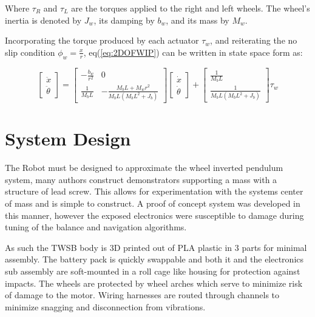     Where $\tau_R$ and $\tau_L$ are the torques applied to the right and left wheels. 
    The wheel's inertia is denoted by $J_w$, its damping by $b_w$, and its mass by $M_w$. 

    Incorporating the torque produced by each actuator $\tau_w$, 
    and reiterating the no slip condition $\phi_w = \frac{x}{r}$,
    eq(\ref{eq:2DOFWIP}) can be written in state space form as:

    \begin{equation}
        \begin{bmatrix}
            \ddot{x} \\
            \ddot{\theta}
        \end{bmatrix}
        =
        \begin{bmatrix}
            -\frac{b_w}{r^2} & 0 \\
            \frac{1}{M_b L} & -\frac{M_b L + M_w r^2}{M_b L (M_b L^2 + J_b)}
        \end{bmatrix}
        \begin{bmatrix}
            \dot{x} \\
            \dot{\theta}
        \end{bmatrix}
        +
        \begin{bmatrix}
            \frac{1}{M_b L} \\
            \frac{1}{M_b L (M_b L^2 + J_b)}
        \end{bmatrix}
        \tau_w
        \label{eq:2DOF}
    \end{equation}


   

    
    \pagebreak{}


    \section{System Design}
        The Robot must be designed to approximate the wheel inverted pendulum system, many authors 
        construct demonstrators supporting a mass with a structure of lead screw. This allows for experimentation 
        with the systems center of mass and is simple to construct. A proof of concept system was developed in this manner, 
        however the exposed electronics were susceptible to damage during tuning of the balance and navigation algorithms.

        As such the TWSB body is 3D printed out of PLA plastic in 3 parts for minimal assembly.
        The battery pack is quickly swappable and both it and the electronics sub assembly 
        are soft-mounted in a roll cage like housing for protection against impacts. 
        The wheels are protected by wheel arches which serve to minimize risk of damage to the motor. 
        Wiring harnesses are routed through channels to minimize snagging and disconnection from vibrations.
        
